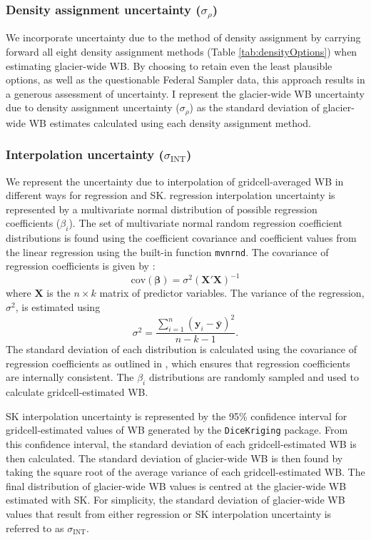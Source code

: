 \documentclass{sfuthesis}
\begin{document}
	\subsubsection{Density assignment uncertainty ($\sigma_{\rho}$)}
We incorporate uncertainty due to the method of density assignment by carrying forward all eight density assignment methods (Table \ref{tab:densityOptions}) when estimating glacier-wide WB. By choosing to retain even the least plausible options, as well as the questionable Federal Sampler data, this approach results in a generous assessment of uncertainty. I represent the glacier-wide WB uncertainty due to density assignment uncertainty ($\sigma_{\rho}$) as the standard deviation of glacier-wide WB estimates calculated using each density assignment method.

	\subsubsection{Interpolation uncertainty ($\sigma_{\mathrm{INT}}$)}
We represent the uncertainty due to interpolation of gridcell-averaged WB in different ways for regression and SK. regression interpolation uncertainty is represented by a multivariate normal distribution of possible regression coefficients ($\beta_i$). The set of multivariate normal random regression coefficient distributions is found using the coefficient covariance and coefficient values from the linear regression using the built-in function \texttt{mvnrnd}. The covariance of regression coefficients is given by \citep{Bagos2015}:
\begin{equation}
\mathrm{cov}\left( \boldsymbol{\beta} \right) = \sigma^2 \left( \boldsymbol{X}'  \boldsymbol{X} \right)^{-1}
\end{equation}
where $\boldsymbol{X}$ is the $n \times k$ matrix of predictor variables. The variance of the regression, $\sigma^2$, is estimated using
\begin{equation}
\sigma^2 = \frac{\sum^n_{i=1} \left(\boldsymbol{y}_i-\bar{\boldsymbol{y}} \right)^2}{n-k-1}.
\end{equation}
The standard deviation of each distribution is calculated using the covariance of regression coefficients as outlined in \cite{Bagos2015}, which ensures that regression coefficients are internally consistent. The $\beta_i$ distributions are randomly sampled and used to calculate gridcell-estimated WB.	

SK interpolation uncertainty is represented by the 95\% confidence interval for gridcell-estimated values of WB generated by the \texttt{DiceKriging} package. From this confidence interval, the standard deviation of each gridcell-estimated WB is then calculated. The standard deviation of glacier-wide WB is then found by taking the square root of the average variance of each gridcell-estimated WB. The final distribution of glacier-wide WB values is centred at the glacier-wide WB estimated with SK. For simplicity, the standard deviation of glacier-wide WB values that result from either regression or SK interpolation uncertainty is referred to as $\sigma_{\mathrm{INT}}$.
\end{document}
